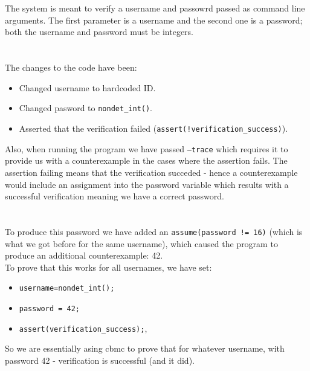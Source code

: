 \documentclass{article}
\begin{document}
\section{}
The system is meant to verify a
username and passowrd passed as command line arguments.
The first parameter is a username
and the second one is a password;
both the username and password must be integers.

\section{}
The changes to the code have been:
\begin{itemize}
    \item Changed username to hardcoded ID.
    \item Changed pasword to \texttt{nondet\_int()}.
    \item Asserted that the verification failed (\texttt{assert(!verification\_success)}).
\end{itemize}
Also, when running the program we have passed \texttt{--trace}
which requires it to provide us with a counterexample in the
cases where the assertion fails.
The assertion failing means that the verification succeded -
hence a counterexample would include an assignment into
the password variable which results with a successful verification
meaning we have a correct password.

\section{}
To produce this password we have added an \texttt{assume(password != 16)} (which is what we got before 
for the same username),
which caused the program to produce an additional counterexample: 42.\\
To prove that this works for all usernames,
we have set:
\begin{itemize}
    \item \texttt{username=nondet\_int();}
    \item \texttt{password = 42;}
    \item \texttt{assert(verification\_success);},
\end{itemize}
So we are essentially asing cbmc to prove that for whatever username,
with password 42 - verification is successful (and it did).

\section{}
\end{document}
